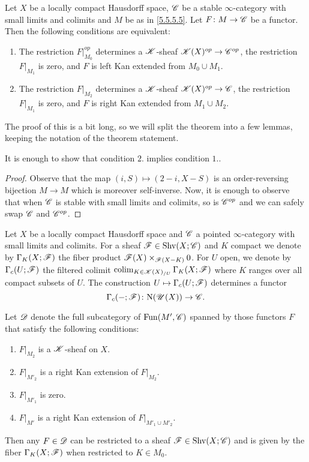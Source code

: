 \documentclass[../../thesis.tex]{subfiles}
\begin{document}
\begin{proposition}[{\cite[Proposition 5.5.5.7]{HA}}]\label{5.5.5.7}
    Let $X$ be a locally compact Hausdorff space, $\mathscr{C}$ be a stable $\infty$-category with small limits and colimits and $M$ be as in \ref{5.5.5.5}.
    Let $F \colon M \to \mathscr{C}$ be a functor.
    Then the following conditions are equivalent:
    \begin{enumerate}
        \item The restriction $F|_{M_0}^{op}$ determines a $\mathscr{K}$-sheaf $\mathscr{K}(X)^{op} \to \mathscr{C}^{op}$, the restriction $F|_{M_1}$ is zero, and $F$ is left Kan extended from $M_0 \cup M_1$.
        \item The restriction $F|_{M_2}$ determines a $\mathscr{K}$-sheaf $\mathscr{K}(X)^{op} \to \mathscr{C}$, the restriction $F|_{M_1}$ is zero, and $F$ is right Kan extended from $M_1 \cup M_2$.
    \end{enumerate}
\end{proposition}
The proof of this is a bit long, so we will split the theorem into a few lemmas, keeping the notation of the theorem statement.
\begin{lemma}
    It is enough to show that condition $2.$ implies condition $1.$.
\end{lemma}
\begin{proof}
    Observe that the map $(i,S) \mapsto (2-i, X-S)$ is an order-reversing bijection $M\to M$ which is moreover self-inverse.
    Now, it is enough to observe that when $\mathscr{C}$ is stable with small limits and colimits, so is $\mathscr{C}^{op}$ and we can safely swap $\mathscr{C}$ and $\mathscr{C}^{op}$.
\end{proof}
\begin{definition}[{\cite[Definition 5.5.5.9]{HA}}]
    Let $X$ be a locally compact Hausdorff space and $\mathscr{C}$ a pointed $\infty$-category with small limits and colimits.
    For a sheaf $\mathscr{F} \in \mathrm{Shv}(X;\mathscr{C})$ and $K$ compact we denote by $\Gamma_K(X;\mathscr{F})$ the fiber product $\mathscr{F}(X)\times_{\mathscr{F}(X-K)}0$.
    For $U$ open, we denote by $\Gamma_c(U;\mathscr{F})$ the filtered colimit $\operatorname{colim}_{K \in\mathscr{K}(X)_{/U}}\Gamma_K(X;\mathscr{F})$ where $K$ ranges over all compact subsets of $U$.
    The construction $U \mapsto \Gamma_c(U;\mathscr{F})$ determines a functor
    \[
        \Gamma_c({-} ;\mathscr{F}) \colon \mathrm{N}(\mathscr{U}(X)) \to \mathscr{C} .
    \]
\end{definition}
\begin{lemma}
    Let $\mathscr{D}$ denote the full subcategory of $\mathrm{Fun}(M', \mathscr{C})$ spanned by those functors $F$ that satisfy the following conditions:
    \begin{enumerate}
        \item $F|_{M_2}$ is a $\mathscr{K}$-sheaf on $X$.
        \item $F|_{M'_2}$ is a right Kan extension of $F|_{M_2}$.
        \item $F|_{M'_1}$ is zero.
        \item $F|_{M'}$ is a right Kan extension of $F|_{M'_1 \cup M'_2}$.
    \end{enumerate}
    Then any $F\in \mathscr{D}$ can be restricted to a sheaf $\mathscr{F} \in \mathrm{Shv}(X;\mathscr{C})$ and is given by the fiber $\Gamma_K(X;\mathscr{F})$ when restricted to $K\in M_0$.
\end{lemma}
\end{document}
